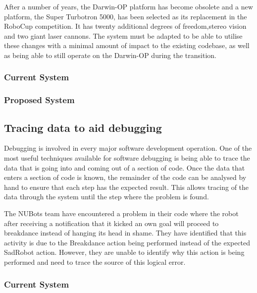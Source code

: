 \documentclass[english,12pt]{scrartcl}
\begin{document}
			After a number of years, the Darwin-OP platform has become obsolete and a new platform,
			the Super Turbotron 5000, has been selected as its replacement in the RoboCup
			competition. It has twenty additional degrees of freedom,stereo vision and two giant
			laser cannons. The system must be adapted to be able to utilise these changes with a
			minimal amount of impact to the existing codebase, as well as being able to still
			operate on the Darwin-OP during the transition.

			\subsubsection{Current System}
			\subsubsection{Proposed System}

		\subsection{Tracing data to aid debugging}
			Debugging is involved in every major software development operation. One of the most
			useful techniques available for software debugging is being able to trace the data that
			is going into and coming out of a section of code. Once the data that enters a section
			of code is known, the remainder of the code can be analysed by hand to ensure that each
			step has the expected result. This allows tracing of the data through the system until
			the step where the problem is found.

			The NUBots team have encountered a problem in their code where the robot after
			receiving a notification that it kicked an own goal will proceed to breakdance instead
			of hanging its head in shame. They have identified that this activity is due to the
			Breakdance action being performed instead of the expected SadRobot action. However, they
			are unable to identify why this action is being performed and need to trace the source
			of this logical error.

			\subsubsection{Current System}
\end{document}
